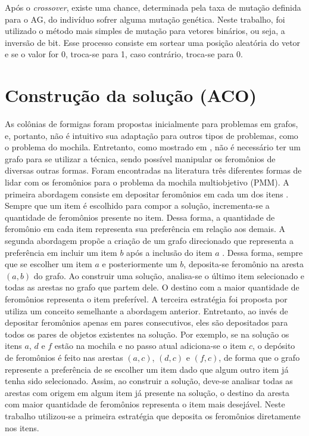 Após o \textit{crossover}, existe uma chance, determinada pela taxa de mutação definida para o AG, do indivíduo sofrer alguma mutação genética. Neste trabalho, foi utilizado o método mais simples de mutação para vetores binários, ou seja, a inversão de bit. Esse processo consiste em sortear uma posição aleatória do vetor e se o valor for 0, troca-se para 1, caso contrário, troca-se para 0.

\section{Construção da solução (ACO)}
\label{section_estrategias_pmm_aco}
As colônias de formigas foram propostas inicialmente para problemas em grafos, e, portanto, não é intuitivo sua adaptação para outros tipos de problemas, como o problema do mochila. Entretanto, como mostrado em \cite{Ke2010}, não é necessário ter um grafo para se utilizar a técnica, sendo possível manipular os feromônios de diversas outras formas. Foram encontradas na literatura três diferentes formas de lidar com os feromônios para o problema da mochila multiobjetivo (PMM). A primeira abordagem consiste em depositar feromônios em cada um dos itens \cite{Leguizamon1999}. Sempre que um item é escolhido para compor a solução, incrementa-se a quantidade de feromônios presente no item. Dessa forma, a quantidade de feromônio em cada item representa sua preferência em relação aos demais. A segunda abordagem propõe a criação de um grafo direcionado que representa a preferência em incluir um item $b$ após a inclusão do item $a$ \cite{Fidanova2003}. Dessa forma, sempre que se escolher um item $a$ e posteriormente um $b$, deposita-se feromônio na aresta $(a,b)$ do grafo. Ao construir uma solução, analisa-se o último item selecionado e todas as arestas no grafo que partem dele. O destino com a maior quantidade de feromônios representa o item preferível. A terceira estratégia foi proposta por \cite{Alaya2004} utiliza um conceito semelhante a abordagem anterior. Entretanto, ao invés de depositar feromônios apenas em pares consecutivos, eles são depositados para todos os pares de objetos existentes na solução. Por exemplo, se na solução os itens $a$, $d$ e $f$ estão na mochila e no passo atual adiciona-se o item $c$, o depósito de feromônios é feito nas arestas $(a,c)$, $(d,c)$ e $(f,c)$, de forma que o grafo represente a preferência de se escolher um item dado que algum outro item já tenha sido selecionado. Assim, ao construir a solução, deve-se analisar todas as arestas com origem em algum item já presente na solução, o destino da aresta com maior quantidade de feromônios representa o item mais desejável. Neste trabalho utilizou-se a primeira estratégia que deposita os feromônios diretamente nos itens.


